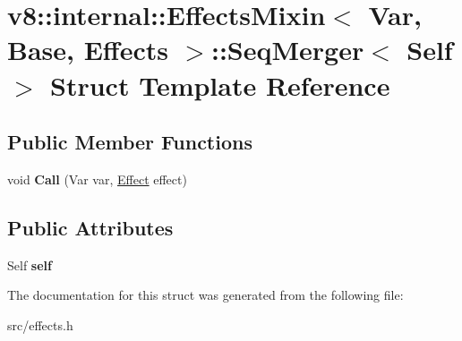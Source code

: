 \hypertarget{structv8_1_1internal_1_1_effects_mixin_1_1_seq_merger}{}\section{v8\+:\+:internal\+:\+:Effects\+Mixin$<$ Var, Base, Effects $>$\+:\+:Seq\+Merger$<$ Self $>$ Struct Template Reference}
\label{structv8_1_1internal_1_1_effects_mixin_1_1_seq_merger}
\subsection*{Public Member Functions}
\begin{DoxyCompactItemize}
\item 
\hypertarget{structv8_1_1internal_1_1_effects_mixin_1_1_seq_merger_a15265437b76878b11d9b2a0332ea6b96}{}void {\bfseries Call} (Var var, \hyperlink{structv8_1_1internal_1_1_effect}{Effect} effect)\label{structv8_1_1internal_1_1_effects_mixin_1_1_seq_merger_a15265437b76878b11d9b2a0332ea6b96}

\end{DoxyCompactItemize}
\subsection*{Public Attributes}
\begin{DoxyCompactItemize}
\item 
\hypertarget{structv8_1_1internal_1_1_effects_mixin_1_1_seq_merger_aab26b00017d02e6458ba0d2726e3caac}{}Self {\bfseries self}\label{structv8_1_1internal_1_1_effects_mixin_1_1_seq_merger_aab26b00017d02e6458ba0d2726e3caac}

\end{DoxyCompactItemize}


The documentation for this struct was generated from the following file\+:\begin{DoxyCompactItemize}
\item 
src/effects.\+h\end{DoxyCompactItemize}

